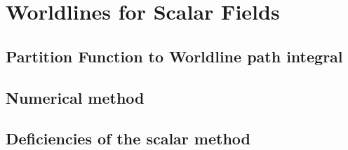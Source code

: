 \chapter{Worldlines for Scalar Fields}
    \section{Partition Function to Worldline path integral}
    \section{Numerical method}
    \section{Deficiencies of the scalar method}


